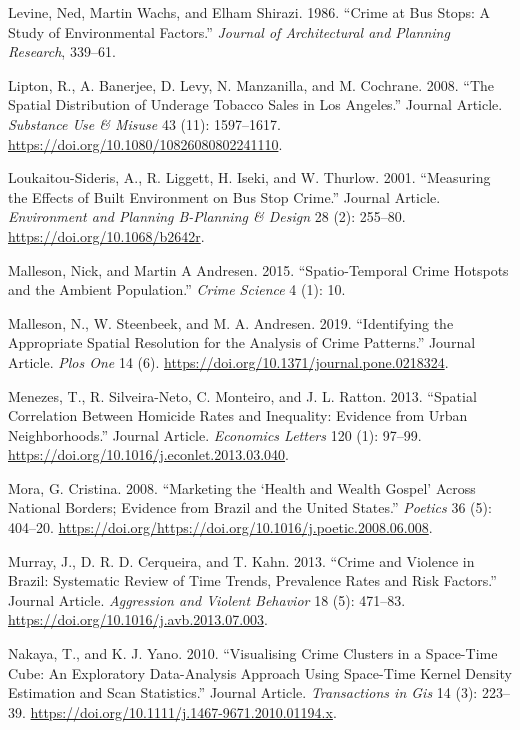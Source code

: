 \documentclass[smallextended]{svjour3}       %
\begin{document}
\leavevmode\hypertarget{ref-Levine1986crime}{}%
Levine, Ned, Martin Wachs, and Elham Shirazi. 1986. ``Crime at Bus
Stops: A Study of Environmental Factors.'' \emph{Journal of
Architectural and Planning Research}, 339--61.

\leavevmode\hypertarget{ref-Lipton2008spatial}{}%
Lipton, R., A. Banerjee, D. Levy, N. Manzanilla, and M. Cochrane. 2008.
``The Spatial Distribution of Underage Tobacco Sales in Los Angeles.''
Journal Article. \emph{Substance Use \& Misuse} 43 (11): 1597--1617.
\url{https://doi.org/10.1080/10826080802241110}.

\leavevmode\hypertarget{ref-Loukaitou2001measuring}{}%
Loukaitou-Sideris, A., R. Liggett, H. Iseki, and W. Thurlow. 2001.
``Measuring the Effects of Built Environment on Bus Stop Crime.''
Journal Article. \emph{Environment and Planning B-Planning \& Design} 28
(2): 255--80. \url{https://doi.org/10.1068/b2642r}.

\leavevmode\hypertarget{ref-Malleson2015spatio}{}%
Malleson, Nick, and Martin A Andresen. 2015. ``Spatio-Temporal Crime
Hotspots and the Ambient Population.'' \emph{Crime Science} 4 (1): 10.

\leavevmode\hypertarget{ref-Malleson2019identifying}{}%
Malleson, N., W. Steenbeek, and M. A. Andresen. 2019. ``Identifying the
Appropriate Spatial Resolution for the Analysis of Crime Patterns.''
Journal Article. \emph{Plos One} 14 (6).
\url{https://doi.org/10.1371/journal.pone.0218324}.

\leavevmode\hypertarget{ref-Menezes2013spatial}{}%
Menezes, T., R. Silveira-Neto, C. Monteiro, and J. L. Ratton. 2013.
``Spatial Correlation Between Homicide Rates and Inequality: Evidence
from Urban Neighborhoods.'' Journal Article. \emph{Economics Letters}
120 (1): 97--99. \url{https://doi.org/10.1016/j.econlet.2013.03.040}.

\leavevmode\hypertarget{ref-Mora2008marketing}{}%
Mora, G. Cristina. 2008. ``Marketing the `Health and Wealth Gospel'
Across National Borders; Evidence from Brazil and the United States.''
\emph{Poetics} 36 (5): 404--20.
\url{https://doi.org/https://doi.org/10.1016/j.poetic.2008.06.008}.

\leavevmode\hypertarget{ref-Murray2013crime}{}%
Murray, J., D. R. D. Cerqueira, and T. Kahn. 2013. ``Crime and Violence
in Brazil: Systematic Review of Time Trends, Prevalence Rates and Risk
Factors.'' Journal Article. \emph{Aggression and Violent Behavior} 18
(5): 471--83. \url{https://doi.org/10.1016/j.avb.2013.07.003}.

\leavevmode\hypertarget{ref-Nakaya2010visualizing}{}%
Nakaya, T., and K. J. Yano. 2010. ``Visualising Crime Clusters in a
Space-Time Cube: An Exploratory Data-Analysis Approach Using Space-Time
Kernel Density Estimation and Scan Statistics.'' Journal Article.
\emph{Transactions in Gis} 14 (3): 223--39.
\url{https://doi.org/10.1111/j.1467-9671.2010.01194.x}.
\end{document}

